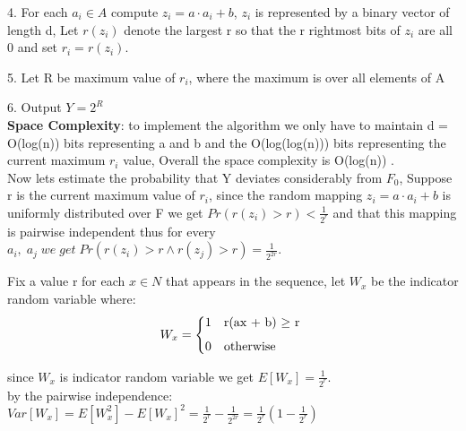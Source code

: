 \documentclass{article}
\begin{document}
4. For each \(a_i \in A\) compute \(z_i = a \cdot a_i + b\), \(z_i\) is represented by a binary vector of length d, Let \(r(z_i)\) denote the largest r so that the r rightmost bits of \(z_i\) are all 0 and set \(r_i = r(z_i)\).

5. Let R be maximum value of \(r_i\), where the maximum is over all elements of A

6. Output \(Y = 2^R\)\\
\textbf{Space Complexity}: to implement the algorithm we only have to maintain d = O(log(n)) bits representing a and b and the O(log(log(n))) bits representing the current maximum $r_i$ value, Overall the space complexity is O(log(n)) .\\

Now lets estimate the probability that Y deviates considerably from $F_0$, Suppose r is the current maximum value of \(r_i\), since the random mapping \(z_i = a \cdot a_i + b\) is uniformly distributed over F we get \(Pr(r(z_i) > r) < \frac{1}{2^r}\) and that this mapping is pairwise independent thus for every \(a_i,\; a_j \; we\; get\; Pr(r(z_i) > r \wedge r(z_j) > r) = \frac{1}{2^{2r}}\).

Fix a value r for each \(x \in N\) that appears in the sequence, let $W_x$ be the
indicator random variable where:
    \[ W_x = 
    \begin{dcases*}
        {1} & r(ax + b) $\geq$ r \\[1ex]
        0 & otherwise
    \end{dcases*}\]

since $W_x$ is indicator random variable we get \(E[W_x] = \frac{1}{2^r}\).\\
by the pairwise independence: \(Var[W_x] = E[W_x^2] - E[W_x]^2 = \frac{1}{2^r} - \frac{1}{2^{2r}} = \frac{1}{2^r}(1 - \frac{1}{2^r})\)
\end{document}
